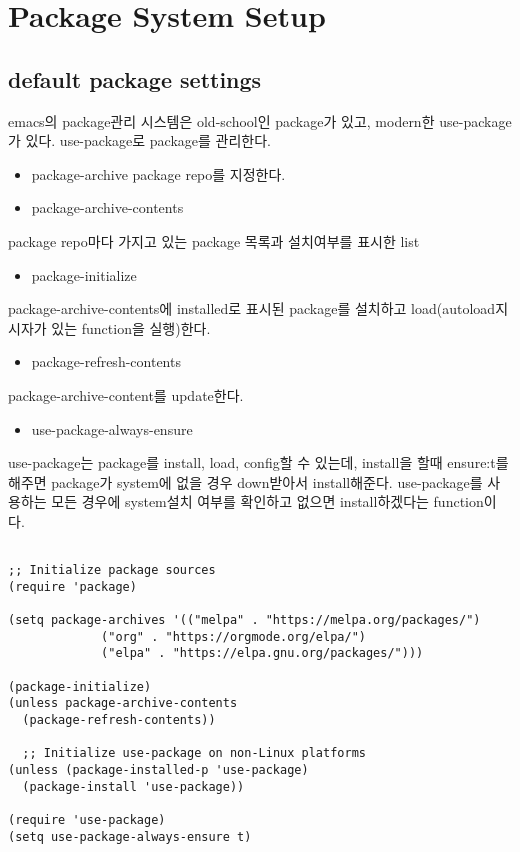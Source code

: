\documentclass[11pt]{article}
\begin{document}
\section*{Package System Setup}
\label{sec:orgbca82b6}

\subsection*{default package settings}
\label{sec:org445790f}
emacs의 package관리 시스템은 old-school인 package가 있고, modern한 use-package가 있다. use-package로 package를 관리한다. 
\begin{itemize}
\item package-archive
package repo를 지정한다.
\item package-archive-contents
\end{itemize}
package repo마다 가지고 있는 package 목록과 설치여부를 표시한 list
\begin{itemize}
\item package-initialize
\end{itemize}
package-archive-contents에 installed로 표시된 package를 설치하고 load(autoload지시자가 있는 function을 실행)한다.
\begin{itemize}
\item package-refresh-contents
\end{itemize}
package-archive-content를 update한다.
\begin{itemize}
\item use-package-always-ensure
\end{itemize}
use-package는 package를 install, load, config할 수 있는데, install을 할때 ensure:t를 해주면 package가 system에 없을 경우 down받아서 install해준다. use-package를 사용하는 모든 경우에 system설치 여부를 확인하고 없으면 install하겠다는 function이다.
\begin{verbatim}

;; Initialize package sources
(require 'package)

(setq package-archives '(("melpa" . "https://melpa.org/packages/")
			 ("org" . "https://orgmode.org/elpa/")
			 ("elpa" . "https://elpa.gnu.org/packages/")))

(package-initialize)
(unless package-archive-contents
  (package-refresh-contents))

  ;; Initialize use-package on non-Linux platforms
(unless (package-installed-p 'use-package)
  (package-install 'use-package))

(require 'use-package)
(setq use-package-always-ensure t)

\end{verbatim}
\end{document}

